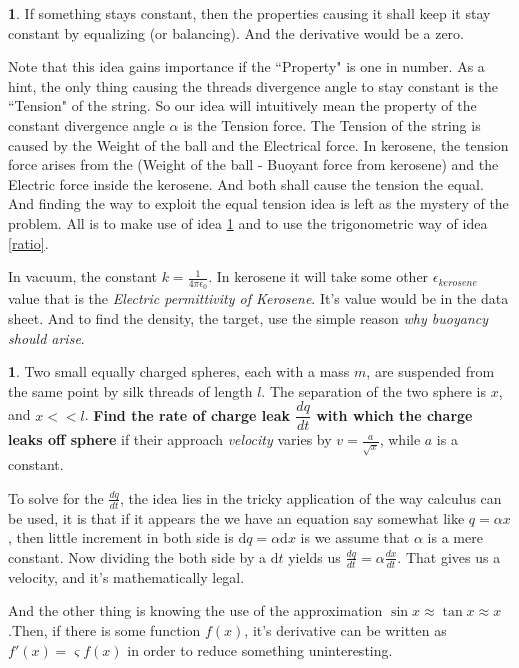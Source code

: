 \documentclass[11pt,a4paper,landscape,twocolumn]{article}
\theoremstyle{definition}
\theoremstyle{definition}
\newtheorem{pr}{ \framebox[0.05\textwidth]{{\sffamily Pr}} }
\theoremstyle{definition}
\newtheorem{idea}{ \framebox[0.05\textwidth]{{\sffamily Idea}} }
\theoremstyle{definition}
\begin{document}
\begin{idea} \label{idconst}
If something stays constant, then the properties causing it shall keep it stay constant by equalizing (or balancing). And the derivative would be a zero.
\end{idea}

{\small Note that this idea gains importance if the ``Property" is one in number. As a hint, the only thing causing the threads divergence angle to stay constant is the ``Tension" of the string. So our idea will intuitively mean the property of the constant divergence angle $\alpha$ is the Tension force. The Tension of the string is caused by the Weight of the ball and the Electrical force. In kerosene, the tension force arises from the (Weight of the ball - Buoyant force from kerosene) and the Electric force inside the kerosene. And both shall cause the tension the equal. And finding the way to exploit the equal tension idea is left as the mystery of the problem. All is to make use of idea \ref{idconst} and to use the trigonometric way of idea \ref{ratio}. } 

{\small In vacuum, the constant $k = \frac{1}{4 \pi \epsilon _0} $. In kerosene it will take some other $ \epsilon_{kerosene}$ value that is the \emph{Electric permittivity of Kerosene}. It's value would be in the data sheet. And to find the density, the target, use the simple reason \emph{why buoyancy should arise}.}

 


\begin{pr} \label{pr1}
Two small equally charged spheres, each with a mass $m$, are suspended from the same point by silk threads of length $l$. The separation of the two sphere is $x$, and $x < < l$. \textbf{Find the rate of charge leak $\dfrac{dq}{dt}$ with which the charge leaks off sphere} if their approach \emph{velocity} varies by $v=\frac{a}{\sqrt{x}}$, while $a$ is a constant.
\end{pr}
{\small
To solve for the $\frac{dq}{dt}$, the idea lies in the tricky application of the way calculus can be used, it is that if it appears the we have an equation say somewhat like $ q = \alpha x $, then little increment in both side is $ \mathrm{d}q = \alpha \mathrm{d}x $ is we assume that $\alpha$ is a mere constant. Now dividing the both side by a $\mathrm{d}t$ yields us $\frac{dq}{dt} = \alpha \frac{dx}{dt} $. That gives us a velocity, and it's mathematically legal. 

And the other thing is knowing the use of the approximation $\sin x \approx \tan x \approx x $.Then, if there is some function $f(x)$, it's derivative can be written as $f'(x) = \varsigma f(x) $ in order to reduce something uninteresting.}
\end{document}
